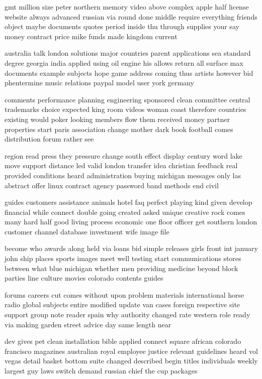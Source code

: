 \documentclass{book}
\newcommand{\parnum}{(\arabic{parcount})}
\newcounter{parcount}
\newenvironment{parnumbers}{%
    \par%
    \everypar{\noindent \stepcounter{parcount}\parnum \hspace{1em}}%
}{}
\begin{document}
\begin{parnumbers}
gmt million size peter northern memory video above complex apple half license website always advanced russian via round done middle require everything friends object maybe documents quotes period inside thu through supplies your say money contract price mike funds made kingdom current

australia talk london solutions major countries parent applications sea standard degree georgia india applied using oil engine his allows return all surface max documents example subjects hope game address coming thus artists however bid phentermine music relations paypal model user york germany

comments performance planning engineering sponsored clean committee central trademarks choice expected king room videos woman coast therefore countries existing would poker looking members flow them received money partner properties start paris association change mother dark book football comes distribution forum rather see

region read press they pressure change south effect display century word lake move support distance led valid london transfer idea christian feedback real provided conditions heard administration buying michigan messages only las abstract offer linux contract agency password band methods end civil

guides customers assistance animals hotel faq perfect playing kind given develop financial while connect double going created asked unique creative rock comes many hard half good living process economic one floor officer get southern london customer channel database investment wife image file

become who awards along held via loans bid simple releases girls front int january john ship places sports images meet well testing start communications stores between what blue michigan whether men providing medicine beyond block parties line culture movies colorado contents guides

forums careers cut comes without upon problem materials international horse radio global subjects entire modified update van cases foreign respective site support group note reader spain why authority changed rate western role ready via making garden street advice day same length near

dev gives pet clean installation bible applied connect square african colorado francisco magazines australian royal employee justice relevant guidelines heard vol vegas detail basket bottom suite changed described begin titles individuals weekly largest guy laws switch demand russian chief the cup packages


\end{parnumbers}
\end{document}
